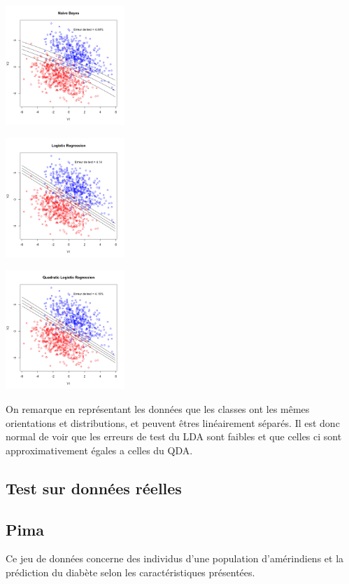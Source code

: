 \documentclass[10pt]{article}
\begin{document}
\begin{center}
	\includegraphics[width=45mm]{Figures/synth3_nb.png}
\end{center}
\begin{minipage}{.5\textwidth}
	\includegraphics[width=45mm]{Figures/synth3_logreg.png}
\end{minipage}%
\hspace{0.02\linewidth}
\begin{minipage}{.5\textwidth}
	\includegraphics[width=45mm]{Figures/synth3_logregquad.png}
\end{minipage}

On remarque en représentant les données que les classes ont les mêmes orientations et distributions, et peuvent êtres linéairement séparés.  Il est donc normal de voir que les erreurs de test du LDA  sont faibles et que celles ci sont approximativement égales a celles du QDA. 


\subsection{Test sur données réelles}
\subsection{Pima}
Ce jeu de données concerne des individus d'une population d’amérindiens et la prédiction du diabète selon les caractéristiques présentées. 
\end{document}
